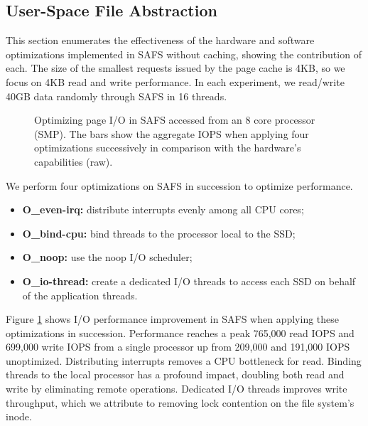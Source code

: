 \subsection{User-Space File Abstraction}
This section enumerates the effectiveness of the hardware and software
optimizations implemented in SAFS without caching,
showing the contribution of each. The size of the smallest
requests issued by the page cache is 4KB, so we focus on 4KB read and write
performance. In each experiment, we read/write 40GB data randomly through
SAFS in 16 threads.

\begin{figure}[tb]
\begin{center}
\vspace{-15pt}

\vspace{-15pt}
\caption{Optimizing page I/O in SAFS accessed from an 8 core processor (SMP).
The bars show the aggregate IOPS when applying four optimizations successively
in comparison with the hardware's capabilities (raw).}
\label{ssd_impr}
\end{center}
\end{figure}

We perform four optimizations on SAFS in succession to optimize performance.
\vspace{-10pt}
\begin{itemize}
\addtolength{\itemsep}{-5pt}
\item {\bf O\_even-irq:} distribute interrupts evenly among all CPU cores;
\item {\bf O\_bind-cpu:} bind threads to the processor local to the SSD;
\item {\bf O\_noop:} use the noop I/O scheduler;
\item {\bf O\_io-thread:} create a dedicated I/O threads to access each SSD on behalf of
the application threads.
\end{itemize}
\vspace{-10pt}
Figure \ref{ssd_impr} shows I/O performance improvement in SAFS when applying
these optimizations in succession.
Performance reaches a peak 765,000 read IOPS and 699,000 write IOPS from 
a single processor up from 209,000 and 191,000 IOPS unoptimized.
Distributing interrupts removes a CPU bottleneck for read.  Binding threads 
to the local processor has a profound impact, doubling both read and write by
eliminating remote operations.
Dedicated I/O threads improves write throughput, which we attribute to 
removing lock contention on the file system's inode.

